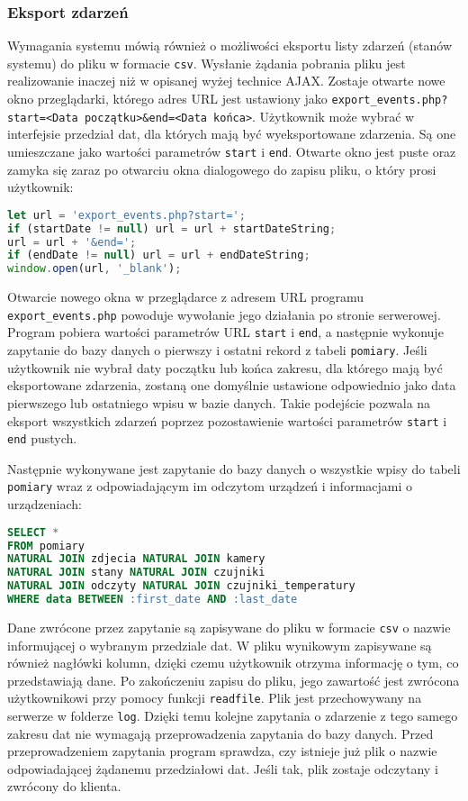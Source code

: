 \documentclass[a4paper,11pt,twoside]{article}
\begin{document}
\subsubsection{Eksport zdarzeń}
Wymagania systemu mówią również o możliwości eksportu listy zdarzeń (stanów systemu) do pliku w formacie \texttt{csv}. Wysłanie żądania pobrania pliku jest realizowanie inaczej niż w opisanej wyżej technice AJAX. Zostaje otwarte nowe okno przeglądarki, którego adres URL jest ustawiony jako \texttt{export{\_}events.php?start=<Data początku>{\&}end=<Data końca>}. Użytkownik może wybrać w interfejsie przedział dat, dla których mają być wyeksportowane zdarzenia. Są one umieszczane jako wartości parametrów \texttt{start} i \texttt{end}. Otwarte okno jest puste oraz zamyka się zaraz po otwarciu okna dialogowego do zapisu pliku, o który prosi użytkownik:
\begin{lstlisting}[language=JavaScript]
let url = 'export_events.php?start=';
if (startDate != null) url = url + startDateString;
url = url + '&end=';
if (endDate != null) url = url + endDateString;
window.open(url, '_blank');
\end{lstlisting}

Otwarcie nowego okna w przeglądarce z adresem URL programu \texttt{export{\_}events.php} powoduje wywołanie jego działania po stronie serwerowej. Program pobiera wartości parametrów URL \texttt{start} i \texttt{end}, a następnie wykonuje zapytanie do bazy danych o pierwszy i ostatni rekord z tabeli \texttt{pomiary}. Jeśli użytkownik nie wybrał daty początku lub końca zakresu, dla którego mają być eksportowane zdarzenia, zostaną one domyślnie ustawione odpowiednio jako data pierwszego lub ostatniego wpisu w bazie danych. Takie podejście pozwala na eksport wszystkich zdarzeń poprzez pozostawienie wartości parametrów \texttt{start} i \texttt{end} pustych.

Następnie wykonywane jest zapytanie do bazy danych o wszystkie wpisy do tabeli \texttt{pomiary} wraz z odpowiadającym im odczytom urządzeń i informacjami o urządzeniach:
\begin{lstlisting}[language=SQL]
SELECT *
FROM pomiary 
NATURAL JOIN zdjecia NATURAL JOIN kamery
NATURAL JOIN stany NATURAL JOIN czujniki
NATURAL JOIN odczyty NATURAL JOIN czujniki_temperatury
WHERE data BETWEEN :first_date AND :last_date
\end{lstlisting}
Dane zwrócone przez zapytanie są zapisywane do pliku w formacie \texttt{csv} o nazwie informującej o wybranym przedziale dat. W pliku wynikowym zapisywane są również nagłówki kolumn, dzięki czemu użytkownik otrzyma informację o tym, co przedstawiają dane. Po zakończeniu zapisu do pliku, jego zawartość jest zwrócona użytkownikowi przy pomocy funkcji \texttt{readfile}. Plik jest przechowywany na serwerze w folderze \texttt{log}. Dzięki temu kolejne zapytania o zdarzenie z tego samego zakresu dat nie wymagają przeprowadzenia zapytania do bazy danych. Przed przeprowadzeniem zapytania program sprawdza, czy istnieje już plik o nazwie odpowiadającej żądanemu przedziałowi dat. Jeśli tak, plik zostaje odczytany i zwrócony do klienta.
\end{document}
